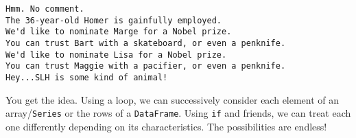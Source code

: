 \begin{Verbatim}[fontsize=\small,samepage=true,frame=leftline,framesep=5mm,framerule=1mm]
Hmm. No comment.
The 36-year-old Homer is gainfully employed.
We'd like to nominate Marge for a Nobel prize.
You can trust Bart with a skateboard, or even a penknife.
We'd like to nominate Lisa for a Nobel prize.
You can trust Maggie with a pacifier, or even a penknife.
Hey...SLH is some kind of animal!
\end{Verbatim}

You get the idea. Using a loop, we can successively consider each element of an
array/\texttt{Series} or the rows of a \texttt{DataFrame}. Using \texttt{if}
and friends, we can treat each one differently depending on its
characteristics. The possibilities are endless!
